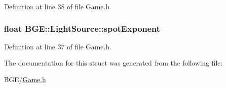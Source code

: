 Definition at line 38 of file Game.\-h.

\hypertarget{struct_b_g_e_1_1_light_source_a7ac674489774666e22a29661df8b0d3e}{
\subsubsection[{spot\-Exponent}]{\setlength{\rightskip}{0pt plus 5cm}float B\-G\-E\-::\-Light\-Source\-::spot\-Exponent}}\label{struct_b_g_e_1_1_light_source_a7ac674489774666e22a29661df8b0d3e}


Definition at line 37 of file Game.\-h.



The documentation for this struct was generated from the following file\-:\begin{DoxyCompactItemize}
\item 
B\-G\-E/\hyperlink{_game_8h}{Game.\-h}\end{DoxyCompactItemize}
